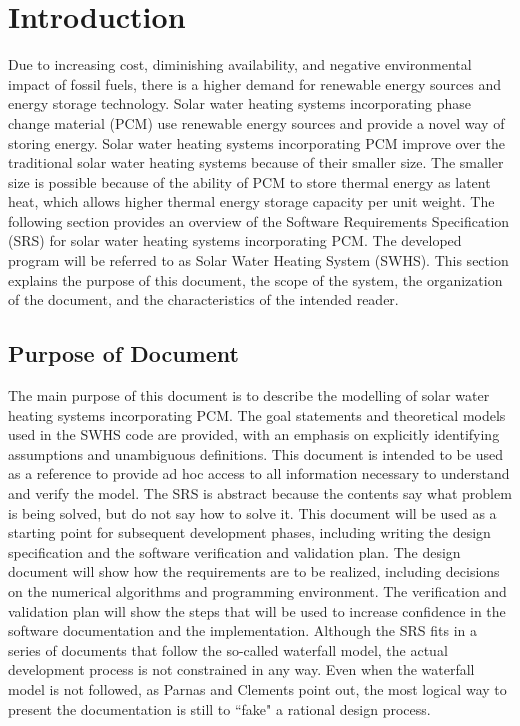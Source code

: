 \documentclass[12pt]{article}
\begin{document}
\section{Introduction}
\label{Sec:Intr}
Due to increasing cost, diminishing availability, and negative environmental impact of fossil fuels, there is a higher demand for renewable energy sources and energy storage technology. Solar water heating systems incorporating phase change material (PCM) use renewable energy sources and provide a novel way of storing energy. Solar water heating systems incorporating PCM improve over the traditional solar water heating systems because of their smaller size. The smaller size is possible because of the ability of PCM to store thermal energy as latent heat, which allows higher thermal energy storage capacity per unit weight.
The following section provides an overview of the Software Requirements Specification (SRS) for solar water heating systems incorporating PCM. The developed program will be referred to as Solar Water Heating System (SWHS). This section explains the purpose of this document, the scope of the system, the organization of the document, and the characteristics of the intended reader.
\subsection{Purpose of Document}
\label{Sec:PurpofDocu}
The main purpose of this document is to describe the modelling of solar water heating systems incorporating PCM. The goal statements and theoretical models used in the SWHS code are provided, with an emphasis on explicitly identifying assumptions and unambiguous definitions. This document is intended to be used as a reference to provide ad hoc access to all information necessary to understand and verify the model. The SRS is abstract because the contents say what problem is being solved, but do not say how to solve it.
This document will be used as a starting point for subsequent development phases, including writing the design specification and the software verification and validation plan. The design document will show how the requirements are to be realized, including decisions on the numerical algorithms and programming environment. The verification and validation plan will show the steps that will be used to increase confidence in the software documentation and the implementation. Although the SRS fits in a series of documents that follow the so-called waterfall model, the actual development process is not constrained in any way. Even when the waterfall model is not followed, as Parnas and Clements point out, the most logical way to present the documentation is still to ``fake" a rational design process.
\end{document}
